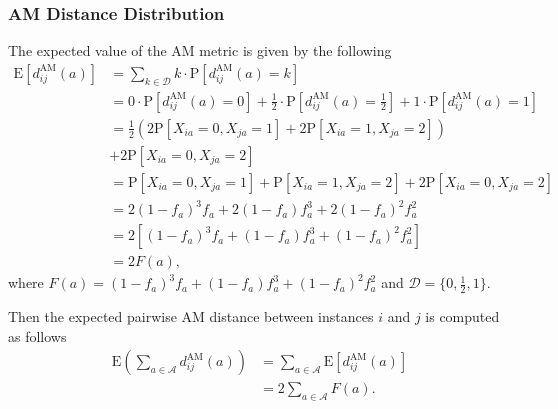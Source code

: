 \documentclass[10pt,letterpaper]{article}\usepackage[]{graphicx}\usepackage[]{color}
\begin{document}
\subsubsection{AM Distance Distribution}

The expected value of the AM metric is given by the following
%
\begin{equation}\label{eq:mean_diff_AM}
\begin{aligned}
\text{E}\left[d^\text{AM}_{ij}(a)\right] &= \sum_{k \in \mathcal{D}} k \cdot \text{P}\left[d^\text{AM}_{ij}(a) = k\right] \\
&= 0 \cdot \text{P}\left[d^\text{AM}_{ij}(a) = 0\right] + \frac{1}{2} \cdot \text{P}\left[d^\text{AM}_{ij}(a) = \frac{1}{2}\right] + 1 \cdot \text{P}\left[d^\text{AM}_{ij}(a) = 1\right] \\
&= \frac{1}{2}\left(2 \text{P}\left[X_{ia} = 0, X_{ja} = 1\right] + 2 \text{P}\left[X_{ia} = 1, X_{ja} = 2\right]\right) \\
&+ 2 \text{P}\left[X_{ia} = 0, X_{ja} = 2\right] \\
&= \text{P}\left[X_{ia} = 0, X_{ja} = 1\right] + \text{P}\left[X_{ia} = 1, X_{ja} = 2\right] + 2 \text{P}\left[X_{ia} = 0, X_{ja} = 2\right] \\
&= 2(1 - f_a)^3f_a + 2(1 - f_a)f^3_a + 2(1 - f_a)^2 f^2_a \\
&= 2\left[(1 - f_a)^3f_a + (1 - f_a)f^3_a + (1 - f_a)^2 f^2_a\right] \\
&= 2F(a),
\end{aligned}
\end{equation}
where $F(a) = (1 - f_a)^3f_a + (1 - f_a)f^3_a + (1 - f_a)^2 f^2_a$ and $\mathcal{D} = \{0,\frac{1}{2},1\}$.

Then the expected pairwise AM distance between instances $i$ and $j$ is computed as follows
%
\begin{equation}\label{eq:mu_DDistr_AM}
\begin{aligned}
\text{E}\left(\sum_{a \in \mathcal{A}} d^\text{AM}_{ij}(a)\right) &= \sum_{a \in \mathcal{A}} \text{E}\left[d^\text{AM}_{ij}(a)\right] \\
&= 2 \sum_{a \in \mathcal{A}} F(a).
\end{aligned}
\end{equation}
\end{document}
